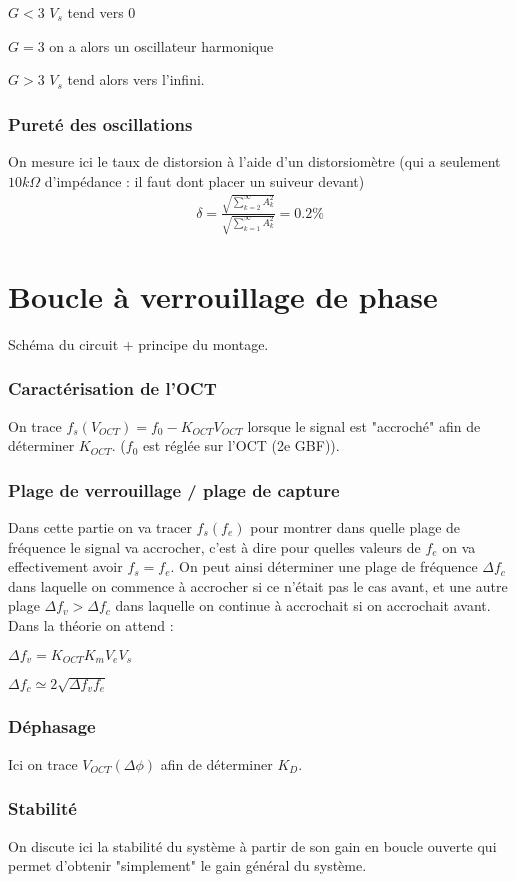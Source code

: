 \documentclass[12pt,prb,aps,epsf]{report}
\begin{document}
$G<3$ $V_s$ tend vers 0

$G=3$ on a alors un oscillateur harmonique

$G>3$ $V_s$ tend alors vers l'infini.
\subsubsection{Pureté des oscillations}
On mesure ici le taux de distorsion à l'aide d'un distorsiomètre (qui a seulement $10k\Omega$ d'impédance : il faut dont placer un suiveur devant)
\begin{eqnarray}
\delta = \frac{\sqrt{\sum_{k=2}^{\infty} A_k^2}}{\sqrt{\sum_{k=1}^{\infty}A_k^2}} = 0.2\%
\end{eqnarray}

\section{Boucle à verrouillage de phase}
Schéma du circuit + principe du montage.
	\subsubsection{Caractérisation de l'OCT}
	On trace $f_s(V_{OCT}) = f_0-K_{OCT}V_{OCT}$ lorsque le signal est "accroché" afin de déterminer $K_{OCT}$. ($f_0$ est réglée sur l'OCT (2e GBF)).
	\subsubsection{Plage de verrouillage / plage de capture}
	Dans cette partie on va tracer $f_s(f_e)$ pour montrer dans quelle plage de fréquence le signal va accrocher, c'est à dire pour quelles valeurs de $f_e$ on va effectivement avoir $f_s=f_e$. On peut ainsi déterminer une plage de fréquence $\Delta f_c$ dans laquelle on commence à accrocher si ce n'était pas le cas avant, et une autre plage $\Delta f_v > \Delta f_c$ dans laquelle on continue à accrochait si on accrochait avant.\\
	Dans la théorie on attend :
	
	$\Delta f_v = K_{OCT}K_m V_e V_s$
	
	$\Delta f_c \simeq 2\sqrt{\Delta f_v f_e}$
	
	\subsubsection{Déphasage}
	Ici on trace $V_{OCT}(\Delta\phi)$ afin de déterminer $K_D$.
	
	\subsubsection{Stabilité}
	On discute ici la stabilité du système à partir de son gain en boucle ouverte qui permet d'obtenir "simplement" le gain général du système.
	
\end{document}

